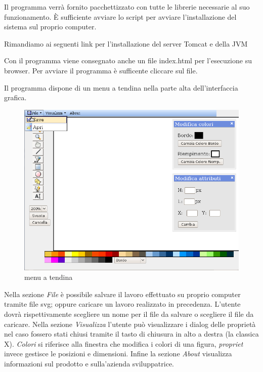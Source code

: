 
Il programma verr\`a fornito pacchettizzato con tutte le librerie necessarie al suo funzionamento. \`E sufficiente avviare lo script per avviare l'installazione del sistema sul proprio computer.

Rimandiamo ai seguenti link per l'installazione del server Tomcat e della JVM
 
Con il programma viene consegnato anche un file index.html per l'esecuzione su browser. 
Per avviare il programma \`e sufficente cliccare sul file.

Il programma dispone di un menu a tendina nella parte alta dell'interfaccia grafica.

\begin{figure}[!ht]
\centering
\includegraphics[scale=0.4]{images/menu.png}
\caption{menu a tendina}
\end{figure} 

Nella sezione \textit{File} \`e possibile salvare il lavoro effettuato su proprio computer tramite file svg; oppure caricare un lavoro realizzato in precedenza. 
L'utente dovr\`a rispettivamente scegliere un nome per il file da salvare o scegliere il file da caricare.
Nella sezione \textit{Visualizza} l'utente pu\`o visualizzare i dialog delle propriet\`a nel caso fossero stati chiusi  tramite il tasto di chiusura in alto a destra (la classica X). \textit{Colori} si riferisce alla finestra che modifica i colori di una figura, \textit{propriet} invece gestisce le posizioni e dimensioni.
Infine la sezione \textit{About} visualizza informazioni sul prodotto e sulla'azienda sviluppatrice.


